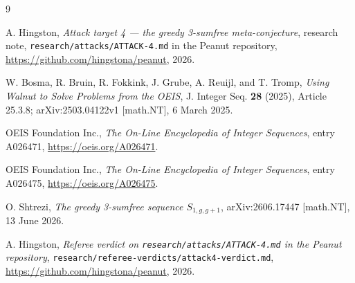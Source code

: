 \documentclass[10pt,reqno]{amsart}
\theoremstyle{plain}
\theoremstyle{definition}
\theoremstyle{remark}
\numberwithin{theorem}{section}
\begin{document}
\begin{thebibliography}{9}
\setlength{\itemsep}{0pt}\setlength{\parsep}{0pt}\setlength{\parskip}{0pt}

A. Hingston,
\emph{Attack target 4 --- the greedy 3-sumfree meta-conjecture},
research note, \texttt{research/attacks/ATTACK-4.md} in the Peanut repository,
\url{https://github.com/hingstona/peanut}, 2026.

W. Bosma, R. Bruin, R. Fokkink, J. Grube, A. Reuijl, and T. Tromp,
\emph{Using Walnut to Solve Problems from the OEIS},
J. Integer Seq. \textbf{28} (2025), Article 25.3.8;
arXiv:2503.04122v1 [math.NT], 6 March 2025.

OEIS Foundation Inc.,
\emph{The On-Line Encyclopedia of Integer Sequences}, entry A026471,
\url{https://oeis.org/A026471}.

OEIS Foundation Inc.,
\emph{The On-Line Encyclopedia of Integer Sequences}, entry A026475,
\url{https://oeis.org/A026475}.

O. Shtrezi,
\emph{The greedy 3-sumfree sequence $S_{1,g,g+1}$},
arXiv:2606.17447 [math.NT], 13 June 2026.

A. Hingston,
\emph{Referee verdict on \texttt{research/attacks/ATTACK-4.md} in the Peanut repository},
\texttt{research/referee-verdicts/attack4-verdict.md},
\url{https://github.com/hingstona/peanut}, 2026.

\end{thebibliography}
\end{document}

